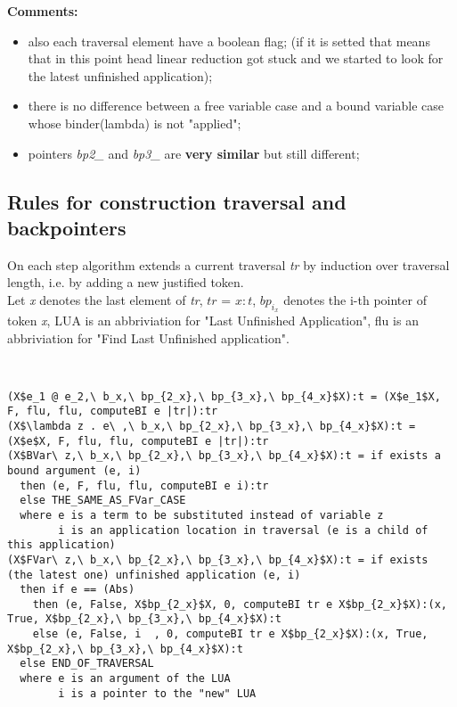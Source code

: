 \documentclass[a4paper, 10pt]{article}
\begin{document}
\textbf{Comments:}
\begin{itemize}
\item also each traversal element have a boolean flag; (if it is setted that means that in this point head linear reduction got stuck and we started to look for the latest unfinished application);
\item there is no difference between a free variable case and a bound variable case whose binder(lambda) is not "applied";
\item pointers \textit{bp2\_} and \textit{bp3\_} are \textbf{very similar} but still different;
\end{itemize}

\subsection{Rules for construction traversal and backpointers}
On each step algorithm extends a current traversal \textit{tr} by induction over traversal length, i.e. by adding a new justified token.\\
Let \textit{x} denotes the last element of \textit{tr},
$tr$ = $x:t$,
$bp_{i_x}$ denotes the i-th pointer of token \textit{x},
LUA is an abbriviation for "Last Unfinished Application",
flu is an abbriviation for "Find Last Unfinished application". \\

\begin{verbatim}


(X$e_1 @ e_2,\ b_x,\ bp_{2_x},\ bp_{3_x},\ bp_{4_x}$X):t = (X$e_1$X, F, flu, flu, computeBI e |tr|):tr
(X$\lambda z . e\ ,\ b_x,\ bp_{2_x},\ bp_{3_x},\ bp_{4_x}$X):t = (X$e$X, F, flu, flu, computeBI e |tr|):tr
(X$BVar\ z,\ b_x,\ bp_{2_x},\ bp_{3_x},\ bp_{4_x}$X):t = if exists a bound argument (e, i)
  then (e, F, flu, flu, computeBI e i):tr
  else THE_SAME_AS_FVar_CASE
  where e is a term to be substituted instead of variable z
        i is an application location in traversal (e is a child of this application)
(X$FVar\ z,\ b_x,\ bp_{2_x},\ bp_{3_x},\ bp_{4_x}$X):t = if exists (the latest one) unfinished application (e, i)
  then if e == (Abs)
    then (e, False, X$bp_{2_x}$X, 0, computeBI tr e X$bp_{2_x}$X):(x, True, X$bp_{2_x},\ bp_{3_x},\ bp_{4_x}$X):t
    else (e, False, i  , 0, computeBI tr e X$bp_{2_x}$X):(x, True, X$bp_{2_x},\ bp_{3_x},\ bp_{4_x}$X):t
  else END_OF_TRAVERSAL
  where e is an argument of the LUA
        i is a pointer to the "new" LUA

\end{verbatim}
\end{document}

